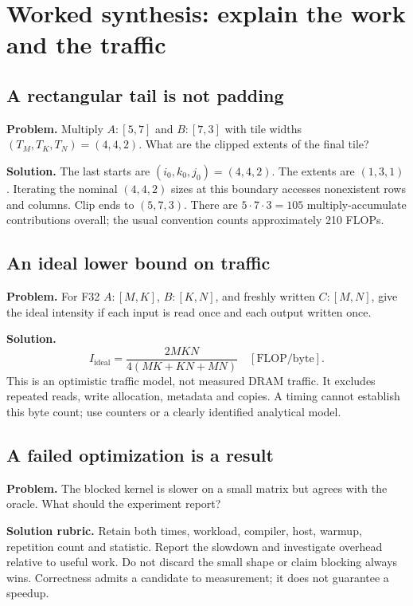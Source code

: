 \clearpage
\section{Worked synthesis: explain the work and the traffic}
\subsection{A rectangular tail is not padding}
\textbf{Problem.} Multiply $A:[5,7]$ and $B:[7,3]$ with tile widths
$(T_M,T_K,T_N)=(4,4,2)$. What are the clipped extents of the final tile?

\textbf{Solution.} The last starts are $(i_0,k_0,j_0)=(4,4,2)$.
The extents are $(1,3,1)$. Iterating the nominal $(4,4,2)$ sizes at this
boundary accesses nonexistent rows and columns. Clip ends to $(5,7,3)$.
There are $5\cdot7\cdot3=105$ multiply-accumulate contributions overall;
the usual convention counts approximately 210 FLOPs.

\subsection{An ideal lower bound on traffic}
\textbf{Problem.} For F32 $A:[M,K]$, $B:[K,N]$, and freshly written $C:[M,N]$,
give the ideal intensity if each input is read once and each output written once.

\textbf{Solution.}
\begin{equation}
I_{\mathrm{ideal}}=\frac{2MKN}{4(MK+KN+MN)}
\quad[\mathrm{FLOP/byte}].
\end{equation}
This is an optimistic traffic model, not measured DRAM traffic. It excludes
repeated reads, write allocation, metadata and copies. A timing cannot establish
this byte count; use counters or a clearly identified analytical model.

\subsection{A failed optimization is a result}
\textbf{Problem.} The blocked kernel is slower on a small matrix but agrees
with the oracle. What should the experiment report?

\textbf{Solution rubric.} Retain both times, workload, compiler, host, warmup,
repetition count and statistic. Report the slowdown and investigate overhead
relative to useful work. Do not discard the small shape or claim blocking
always wins. Correctness admits a candidate to measurement; it does not
guarantee a speedup.

